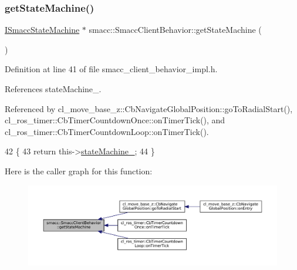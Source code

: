 \subsubsection{\texorpdfstring{get\+State\+Machine()}{getStateMachine()}}
{\footnotesize\ttfamily \hyperlink{classsmacc_1_1ISmaccStateMachine}{I\+Smacc\+State\+Machine} $\ast$ smacc\+::\+Smacc\+Client\+Behavior\+::get\+State\+Machine (\begin{DoxyParamCaption}{ }\end{DoxyParamCaption})\hspace{0.3cm}{\ttfamily [inline]}}



Definition at line 41 of file smacc\+\_\+client\+\_\+behavior\+\_\+impl.\+h.



References state\+Machine\+\_\+.



Referenced by cl\+\_\+move\+\_\+base\+\_\+z\+::\+Cb\+Navigate\+Global\+Position\+::go\+To\+Radial\+Start(), cl\+\_\+ros\+\_\+timer\+::\+Cb\+Timer\+Countdown\+Once\+::on\+Timer\+Tick(), and cl\+\_\+ros\+\_\+timer\+::\+Cb\+Timer\+Countdown\+Loop\+::on\+Timer\+Tick().


\begin{DoxyCode}
42 \{
43     \textcolor{keywordflow}{return} this->\hyperlink{classsmacc_1_1SmaccClientBehavior_a7950b5684d6de0a8e8959c0936ce9a19}{stateMachine\_};
44 \}
\end{DoxyCode}
Here is the caller graph for this function\+:
\nopagebreak
\begin{figure}[H]
\begin{center}
\leavevmode
\includegraphics[width=350pt]{classsmacc_1_1SmaccClientBehavior_aa817da149f366f6a28794c04eb0744b0_icgraph}
\end{center}
\end{figure}
\mbox{\label{classsmacc_1_1SmaccClientBehavior_a7962382f93987c720ad432fef55b123f}} 
